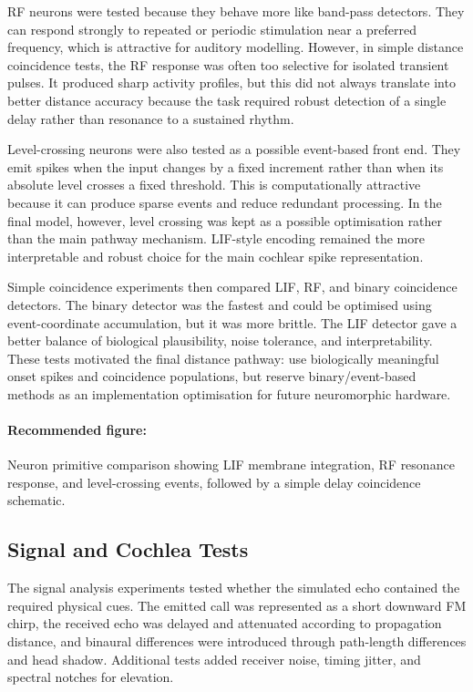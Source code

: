 RF neurons were tested because they behave more like band-pass detectors. They can respond strongly to repeated or periodic stimulation near a preferred frequency, which is attractive for auditory modelling. However, in simple distance coincidence tests, the RF response was often too selective for isolated transient pulses. It produced sharp activity profiles, but this did not always translate into better distance accuracy because the task required robust detection of a single delay rather than resonance to a sustained rhythm.

Level-crossing neurons were also tested as a possible event-based front end. They emit spikes when the input changes by a fixed increment rather than when its absolute level crosses a fixed threshold. This is computationally attractive because it can produce sparse events and reduce redundant processing. In the final model, however, level crossing was kept as a possible optimisation rather than the main pathway mechanism. LIF-style encoding remained the more interpretable and robust choice for the main cochlear spike representation.

Simple coincidence experiments then compared LIF, RF, and binary coincidence detectors. The binary detector was the fastest and could be optimised using event-coordinate accumulation, but it was more brittle. The LIF detector gave a better balance of biological plausibility, noise tolerance, and interpretability. These tests motivated the final distance pathway: use biologically meaningful onset spikes and coincidence populations, but reserve binary/event-based methods as an implementation optimisation for future neuromorphic hardware.

\paragraph{Recommended figure:} Neuron primitive comparison showing LIF membrane integration, RF resonance response, and level-crossing events, followed by a simple delay coincidence schematic.

\subsection{Signal and Cochlea Tests}

The signal analysis experiments tested whether the simulated echo contained the required physical cues. The emitted call was represented as a short downward FM chirp, the received echo was delayed and attenuated according to propagation distance, and binaural differences were introduced through path-length differences and head shadow. Additional tests added receiver noise, timing jitter, and spectral notches for elevation.

